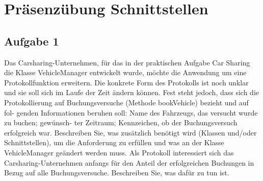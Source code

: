 \chapter{Präsenzübung Schnittstellen}

\section{Aufgabe 1}

Das Carsharing-Unternehmen, für das in der praktischen Aufgabe Car Sharing die Klasse VehicleManager
entwickelt wurde, möchte die Anwendung um eine Protokollfunktion erweitern. Die konkrete Form
des Protokolls ist noch unklar und sie soll sich im Laufe der Zeit ändern können. Fest steht jedoch,
dass sich die Protokollierung auf Buchungsversuche (Methode bookVehicle) bezieht und auf fol-
genden Informationen beruhen soll: Name des Fahrzeugs, das versucht wurde zu buchen; gewünsch-
ter Zeitraum; Kennzeichen, ob der Buchungsversuch erfolgreich war.
Beschreiben Sie, was zusätzlich benötigt wird (Klassen und/oder Schnittstellen), um die Anforderung
zu erfüllen und was an der Klasse VehicleManager geändert werden muss.
Als Protokoll interessiert sich das Carsharing-Unternehmen anfangs für den Anteil der erfolgreichen
Buchungen in Bezug auf alle Buchungsversuche. Beschreiben Sie, was dafür zu tun ist.